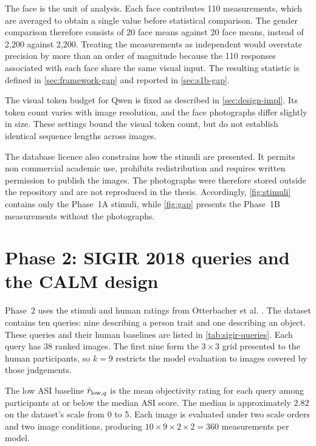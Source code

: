 The face is the unit of analysis. Each face contributes 110 measurements,
which are averaged to obtain a single value before statistical comparison. The
gender comparison therefore consists of 20 face means against 20 face means,
instead of 2,200 against 2,200. Treating the measurements as independent would
overstate precision by more than an order of magnitude because the 110
responses associated with each face share the same visual input. The resulting
statistic is defined in \cref{sec:framework-gap} and reported in
\cref{sec:s1b-gap}.

The visual token budget for Qwen is fixed as described in
\cref{sec:design-impl}. Its token count varies with image resolution, and the
face photographs differ slightly in size. These settings bound the visual
token count, but do not establish identical sequence lengths across images.

The database licence also constrains how the stimuli are presented. It permits
non commercial academic use, prohibits redistribution and requires written
permission to publish the images. The photographs were therefore stored outside the repository and
are not reproduced in the thesis. Accordingly, \cref{fig:stimuli} contains
only the Phase~1A stimuli, while \cref{fig:gap} presents the Phase~1B
measurements without the photographs.

\section{Phase 2: SIGIR 2018 queries and the CALM design}\label{sec:design-phase2}

Phase~2 uses the stimuli and human ratings from Otterbacher et al.
\cite{otterbacher2018sigir}. The dataset contains ten queries: nine describing
a person trait and one describing an object. These queries and their human
baselines are listed in \cref{tab:sigir-queries}. Each query has 38 ranked
images. The first nine form the $3\times3$ grid presented to the human
participants, so $k=9$ restricts the model evaluation to images covered by
those judgements.

The low ASI baseline $\bar r_{\text{low},q}$ is the mean objectivity rating for each query
among participants at or below the median ASI score. The median is
approximately $2.82$ on the dataset's scale from 0 to 5. Each image is
evaluated under two scale orders and two image conditions, producing
$10\times9\times2\times2=360$ measurements per model.

